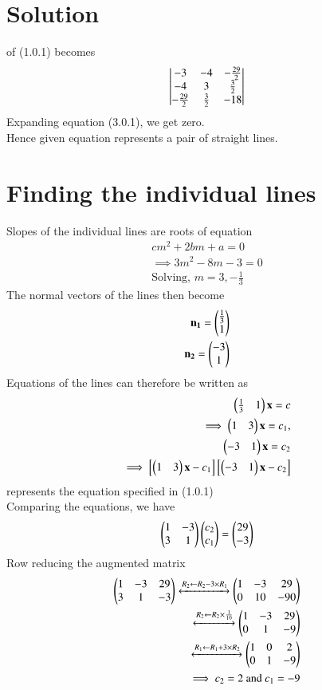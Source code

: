 \documentclass[journal,12pt,twocolumn]{IEEEtran}
\begin{document}
\section{Solution}
 of (1.0.1) becomes
\begin{align}
    \begin{vmatrix}-3&-4&-\frac{29}{2}\\-4&3&\frac{3}{2}\\-\frac{29}{2}&\frac{3}{2}&-18\end{vmatrix}
\end{align}
Expanding equation (3.0.1), we get zero.\\
Hence given equation represents a pair of straight lines.
\section{Finding the individual lines}
Slopes of the individual lines are roots of equation 
\begin{align}
    cm^2+2bm+a=0\\
    \implies 3m^2-8m-3=0\\
    \text{Solving, }m=3,-\frac{1}{3}
\end{align}
The normal vectors of the lines then become
\begin{align}
    \mathbf{n_1}=\begin{pmatrix}\frac{1}{3}\\1\end{pmatrix}\\
    \mathbf{n_2}=\begin{pmatrix}-3\\1\end{pmatrix}
\end{align}
Equations of the lines can therefore be written as
\begin{align}
  \begin{pmatrix}\frac{1}{3}&1\end{pmatrix}\mathbf{x}=c\\
 \implies \begin{pmatrix}1&3\end{pmatrix}\mathbf{x}=c_1 ,\\
   \begin{pmatrix}-3&1\end{pmatrix}\mathbf{x}=c_2\\
  \implies \left[\begin{pmatrix}1&3\end{pmatrix}\mathbf{x}-c_1\right]\left[\begin{pmatrix}-3&1\end{pmatrix}\mathbf{x}-c_2\right]
\end{align}
represents the equation specified in (1.0.1)\\
Comparing the equations, we have
\begin{align}
    \begin{pmatrix}1&-3\\3&1\end{pmatrix}\begin{pmatrix}c_2\\c_1\end{pmatrix}=\begin{pmatrix}29\\-3\end{pmatrix}\\
 \end{align}
 Row reducing the augmented matrix
 \begin{align}
    \begin{pmatrix}1&-3&29\\3&1&-3\end{pmatrix}\xleftrightarrow[]{R_2\leftarrow R_2-3\times R_1}
    \begin{pmatrix}1&-3&29\\0&10&-90\end{pmatrix}\\
    \xleftrightarrow[]{R_2\leftarrow R_2\times \frac{1}{10}}
    \begin{pmatrix}1&-3&29\\0&1&-9\end{pmatrix}\\
    \xleftrightarrow[]{R_1\leftarrow R_1+3\times R_2}
    \begin{pmatrix}1&0&2\\0&1&-9\end{pmatrix}\\
    \implies c_2=2 \text{ and }c_1=-9
\end{align}
\end{document}
